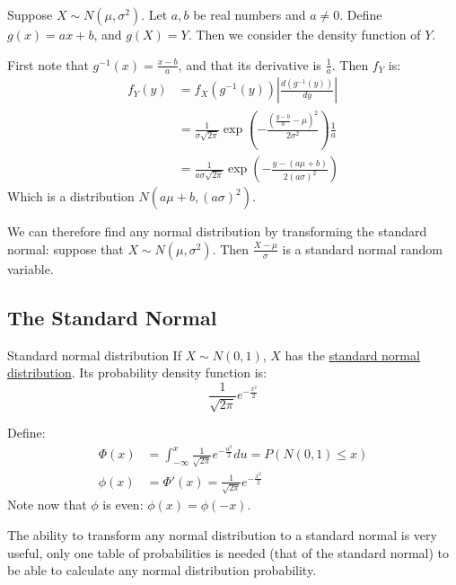 \documentclass[../Main.tex]{subfiles}
\begin{document}
\begin{example}
    Suppose $X \sim N(\mu, \sigma^2)$. Let $a, b$ be real numbers and $a \neq 0$. Define $g(x) = ax + b$, and $g(X) = Y$. Then we consider the density function of $Y$.\par
    First note that $g^{-1}(x) = \frac{x - b}{a}$, and that its derivative is $\frac{1}{a}$. Then $f_{Y}$ is:
    \begin{align*}
        f_Y(y) &= f_X (g^{-1}(y)) \left|\frac{d(g^{-1}(y))}{dy}\right| \\
        &= \frac{1}{\sigma\sqrt{2\pi}} \exp{\left(-\frac{\left(\frac{y - b}{a} - \mu\right)^2}{2\sigma^2}\right)} \frac{1}{a} \\
        &= \frac{1}{a\sigma\sqrt{2\pi}} \exp{\left(-\frac{y - (a\mu + b)}{2(a\sigma)^2}\right)}
    \end{align*}
    Which is a distribution $N(a\mu + b, (a\sigma)^2)$.\par
    We can therefore find any normal distribution by transforming the standard normal: suppose that $X \sim N(\mu, \sigma^2)$. Then $\frac{X - \mu}{\sigma}$ is a standard normal random variable.
\end{example}
\subsection{The Standard Normal}
\begin{definition}{Standard normal distribution}
    If $X \sim N(0, 1)$, $X$ has the \underline{standard normal distribution}. Its probability density function is:
    \begin{equation*}
        \frac{1}{\sqrt{2\pi}} e^{-\frac{x^2}{2}}
    \end{equation*}
\end{definition}
\begin{example}
    Define:
    \begin{align*}
        \Phi(x) &= \int_{-\infty}^x \frac{1}{\sqrt{2\pi}} e^{-\frac{u^2}{2}} du = P(N(0, 1) \leq x) \\
        \phi(x) &= \Phi'(x) = \frac{1}{\sqrt{2\pi}} e^{-\frac{x^2}{2}}
    \end{align*}
    Note now that $\phi$ is even: $\phi(x) = \phi(-x)$.
\end{example}
The ability to transform any normal distribution to a standard normal is very useful, only one table of probabilities is needed (that of the standard normal) to be able to calculate any normal distribution probability.
\end{document}
